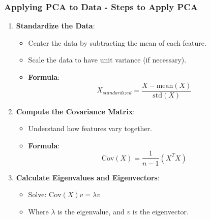 \documentclass[aspectratio=169]{beamer}
\begin{document}
\begin{frame}[fragile]
    \frametitle{Applying PCA to Data - Steps to Apply PCA}
    \begin{enumerate}
        \item \textbf{Standardize the Data}:
            \begin{itemize}
                \item Center the data by subtracting the mean of each feature.
                \item Scale the data to have unit variance (if necessary).
                \item \textbf{Formula}: 
                \begin{equation}
                    X_{standardized} = \frac{X - \text{mean}(X)}{\text{std}(X)}
                \end{equation}
            \end{itemize}
        \item \textbf{Compute the Covariance Matrix}:
            \begin{itemize}
                \item Understand how features vary together.
                \item \textbf{Formula}:
                \begin{equation}
                    \text{Cov}(X) = \frac{1}{n-1}(X^T X)
                \end{equation}
            \end{itemize}
        \item \textbf{Calculate Eigenvalues and Eigenvectors}:
            \begin{itemize}
                \item Solve: \(\text{Cov}(X) v = \lambda v\)
                \item Where \(\lambda\) is the eigenvalue, and \(v\) is the eigenvector.
            \end{itemize}
    \end{enumerate}
\end{frame}
\end{document}
